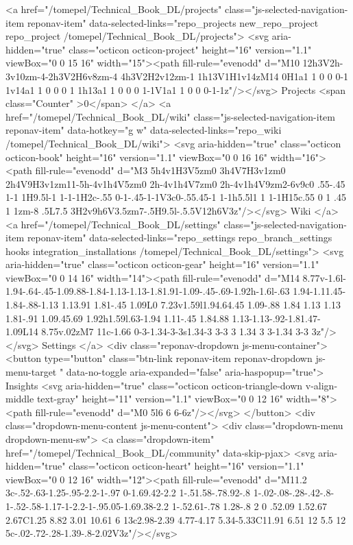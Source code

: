     <a href="/tomepel/Technical_Book_DL/projects" class="js-selected-navigation-item reponav-item" data-selected-links="repo_projects new_repo_project repo_project /tomepel/Technical_Book_DL/projects">
      <svg aria-hidden="true" class="octicon octicon-project" height="16" version="1.1" viewBox="0 0 15 16" width="15"><path fill-rule="evenodd" d="M10 12h3V2h-3v10zm-4-2h3V2H6v8zm-4 4h3V2H2v12zm-1 1h13V1H1v14zM14 0H1a1 1 0 0 0-1 1v14a1 1 0 0 0 1 1h13a1 1 0 0 0 1-1V1a1 1 0 0 0-1-1z"/></svg>
      Projects
      <span class="Counter" >0</span>
</a>
    <a href="/tomepel/Technical_Book_DL/wiki" class="js-selected-navigation-item reponav-item" data-hotkey="g w" data-selected-links="repo_wiki /tomepel/Technical_Book_DL/wiki">
      <svg aria-hidden="true" class="octicon octicon-book" height="16" version="1.1" viewBox="0 0 16 16" width="16"><path fill-rule="evenodd" d="M3 5h4v1H3V5zm0 3h4V7H3v1zm0 2h4V9H3v1zm11-5h-4v1h4V5zm0 2h-4v1h4V7zm0 2h-4v1h4V9zm2-6v9c0 .55-.45 1-1 1H9.5l-1 1-1-1H2c-.55 0-1-.45-1-1V3c0-.55.45-1 1-1h5.5l1 1 1-1H15c.55 0 1 .45 1 1zm-8 .5L7.5 3H2v9h6V3.5zm7-.5H9.5l-.5.5V12h6V3z"/></svg>
      Wiki
</a>
      <a href="/tomepel/Technical_Book_DL/settings" class="js-selected-navigation-item reponav-item" data-selected-links="repo_settings repo_branch_settings hooks integration_installations /tomepel/Technical_Book_DL/settings">
        <svg aria-hidden="true" class="octicon octicon-gear" height="16" version="1.1" viewBox="0 0 14 16" width="14"><path fill-rule="evenodd" d="M14 8.77v-1.6l-1.94-.64-.45-1.09.88-1.84-1.13-1.13-1.81.91-1.09-.45-.69-1.92h-1.6l-.63 1.94-1.11.45-1.84-.88-1.13 1.13.91 1.81-.45 1.09L0 7.23v1.59l1.94.64.45 1.09-.88 1.84 1.13 1.13 1.81-.91 1.09.45.69 1.92h1.59l.63-1.94 1.11-.45 1.84.88 1.13-1.13-.92-1.81.47-1.09L14 8.75v.02zM7 11c-1.66 0-3-1.34-3-3s1.34-3 3-3 3 1.34 3 3-1.34 3-3 3z"/></svg>
        Settings
</a>
    <div class="reponav-dropdown js-menu-container">
      <button type="button" class="btn-link reponav-item reponav-dropdown js-menu-target " data-no-toggle aria-expanded="false" aria-haspopup="true">
        Insights
        <svg aria-hidden="true" class="octicon octicon-triangle-down v-align-middle text-gray" height="11" version="1.1" viewBox="0 0 12 16" width="8"><path fill-rule="evenodd" d="M0 5l6 6 6-6z"/></svg>
      </button>
      <div class="dropdown-menu-content js-menu-content">
        <div class="dropdown-menu dropdown-menu-sw">
            <a class="dropdown-item" href="/tomepel/Technical_Book_DL/community" data-skip-pjax>
              <svg aria-hidden="true" class="octicon octicon-heart" height="16" version="1.1" viewBox="0 0 12 16" width="12"><path fill-rule="evenodd" d="M11.2 3c-.52-.63-1.25-.95-2.2-1-.97 0-1.69.42-2.2 1-.51.58-.78.92-.8 1-.02-.08-.28-.42-.8-1-.52-.58-1.17-1-2.2-1-.95.05-1.69.38-2.2 1-.52.61-.78 1.28-.8 2 0 .52.09 1.52.67 2.67C1.25 8.82 3.01 10.61 6 13c2.98-2.39 4.77-4.17 5.34-5.33C11.91 6.51 12 5.5 12 5c-.02-.72-.28-1.39-.8-2.02V3z"/></svg>
